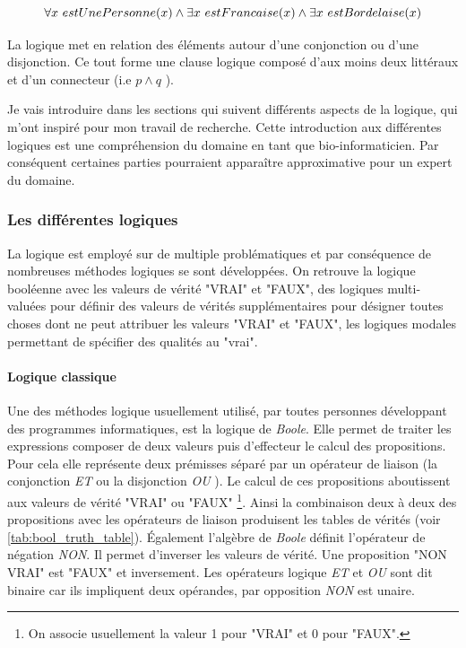 \begin{refsegment}
    \begin{equation*}
        \forall x~estUnePersonne(x) \land \exists x~estFrancaise(x) \land \exists x~estBordelaise(x) \stepcounter{equation}
    \end{equation*}
    
    
    La logique met en relation des éléments autour d'une conjonction ou d'une disjonction. Ce tout forme une clause logique composé d'aux moins deux littéraux et d'un connecteur (i.e $p \land q$ ).
    
    Je vais introduire dans les sections qui suivent différents aspects de la logique, qui m'ont inspiré pour mon travail de recherche. Cette introduction aux différentes logiques est une compréhension du domaine en tant que bio-informaticien. Par conséquent certaines parties pourraient apparaître approximative pour un expert du domaine.
    
    \subsubsection{Les différentes logiques}
    
    La logique est employé sur de multiple problématiques et par conséquence de nombreuses méthodes logiques se sont développées. On retrouve la logique booléenne avec les valeurs de vérité "VRAI" et "FAUX", des logiques multi-valuées pour définir des valeurs de vérités supplémentaires pour désigner toutes choses dont ne peut attribuer les valeurs  "VRAI" et "FAUX", les logiques modales permettant de spécifier des qualités au "vrai".
    
    \paragraph{Logique classique}
    
    Une des méthodes logique usuellement utilisé, par toutes personnes développant des programmes informatiques, est la logique de \textit{Boole}. Elle permet de traiter les expressions composer de deux valeurs puis d'effecteur le calcul des propositions. Pour cela elle représente deux prémisses séparé par un opérateur de liaison (la conjonction \textit{ET} ou la disjonction \textit{OU} ). Le calcul de ces propositions aboutissent aux valeurs de vérité "VRAI" ou "FAUX" \footnote{On associe usuellement la valeur 1 pour "VRAI" et 0 pour "FAUX".}. Ainsi la combinaison deux à deux des propositions avec les opérateurs de liaison produisent les tables de vérités (voir \cref{tab:bool_truth_table}). Également l'algèbre de \textit{Boole} définit l'opérateur de négation \textit{NON}. Il permet d'inverser les valeurs de vérité. Une proposition "NON VRAI" est "FAUX" et inversement. Les opérateurs logique \textit{ET} et \textit{OU} sont dit binaire car ils impliquent deux opérandes, par opposition \textit{NON} est unaire.
    

\end{refsegment}
